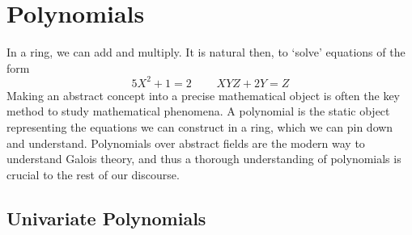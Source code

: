 %
%
%
%








\chapter{Polynomials}

In a ring, we can add and multiply. It is natural then, to `solve' equations of the form
%
\[ 5 X^2 + 1 = 2\ \ \ \ \ \ \ \ \ \ XYZ + 2Y = Z \]
%
Making an abstract concept into a precise mathematical object is often the key method to study mathematical phenomena. A polynomial is the static object representing the equations we can construct in a ring, which we can pin down and understand. Polynomials over abstract fields are the modern way to understand Galois theory, and thus a thorough understanding of polynomials is crucial to the rest of our discourse.

\section{Univariate Polynomials}

